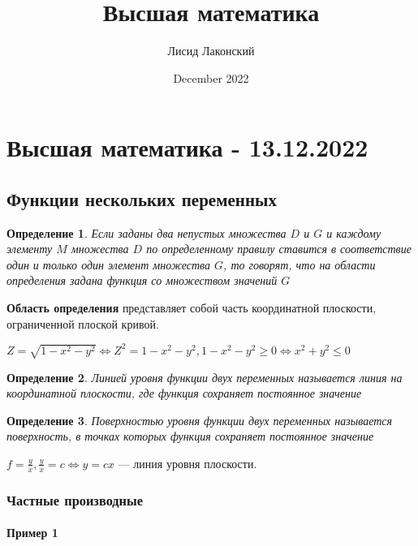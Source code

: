 \documentclass{article}
\title{Высшая математика}
\author{Лисид Лаконский}
\date{December 2022}
\newtheorem{definition}{Определение}
\begin{document}
\maketitle

\tableofcontents
\pagebreak

\section{Высшая математика - 13.12.2022}

\subsection{Функции нескольких переменных}

\begin{flushleft}

\begin{definition}
Если заданы два непустых множества $D$ и $G$ и каждому элементу $M$ множества $D$ по определенному правилу ставится в соответствие один и только один элемент множества $G$, то говорят, что на области определения задана функция со множеством значений $G$
\end{definition}

\textbf{Область определения} представляет собой часть координатной плоскости, ограниченной плоской кривой.

\hfill

$Z = \sqrt{1 - x^2 - y^2} \Longleftrightarrow Z^{2} = 1 - x^2 - y^2, 1 - x^2 - y^2 \ge 0 \Longleftrightarrow x^2 + y^2 \le 0$

\begin{definition}
    Линией уровня функции двух переменных называется линия на координатной плоскости, где функция сохраняет постоянное значение
\end{definition}

\begin{definition}
    Поверхностью уровня функции двух переменных называется поверхность, в точках которых функция сохраняет постоянное значение
\end{definition}

$f = \frac{y}{x}, \frac{y}{x} = c \Longleftrightarrow y = cx$ — линия уровня плоскости.

\subsubsection{Частные производные}

\paragraph{Пример 1}


\end{flushleft}
\end{document}
